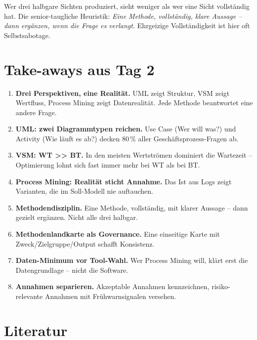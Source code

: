 \documentclass[11pt,a4paper,oneside]{article}
\begin{document}
\begin{merkbox}
Wer drei halbgare Sichten produziert, sieht weniger als wer eine Sicht vollständig hat. Die senior-taugliche Heuristik: \emph{Eine Methode, vollständig, klare Aussage -- dann ergänzen, wenn die Frage es verlangt.} Ehrgeizige Vollständigkeit ist hier oft Selbstsabotage.
\end{merkbox}

\section{Take-aways aus Tag 2}

\begin{enumerate}
  \item \textbf{Drei Perspektiven, eine Realität.} UML zeigt Struktur, VSM zeigt Wertfluss, Process Mining zeigt Datenrealität. Jede Methode beantwortet eine andere Frage.
  \item \textbf{UML: zwei Diagrammtypen reichen.} Use Case (Wer will was?) und Activity (Wie läuft es ab?) decken 80\,\% aller Geschäftsprozess-Fragen ab.
  \item \textbf{VSM: WT \textgreater\textgreater{} BT.} In den meisten Wertströmen dominiert die Wartezeit -- Optimierung lohnt sich fast immer mehr bei WT als bei BT.
  \item \textbf{Process Mining: Realität sticht Annahme.} Das Ist aus Logs zeigt Varianten, die im Soll-Modell nie auftauchen.
  \item \textbf{Methodendisziplin.} Eine Methode, vollständig, mit klarer Aussage -- dann gezielt ergänzen. Nicht alle drei halbgar.
  \item \textbf{Methodenlandkarte als Governance.} Eine einseitige Karte mit Zweck/Zielgruppe/Output schafft Konsistenz.
  \item \textbf{Daten-Minimum vor Tool-Wahl.} Wer Process Mining will, klärt erst die Datengrundlage -- nicht die Software.
  \item \textbf{Annahmen separieren.} Akzeptable Annahmen kennzeichnen, risiko-relevante Annahmen mit Frühwarnsignalen versehen.
\end{enumerate}

\clearpage
\section{Literatur}
\end{document}
